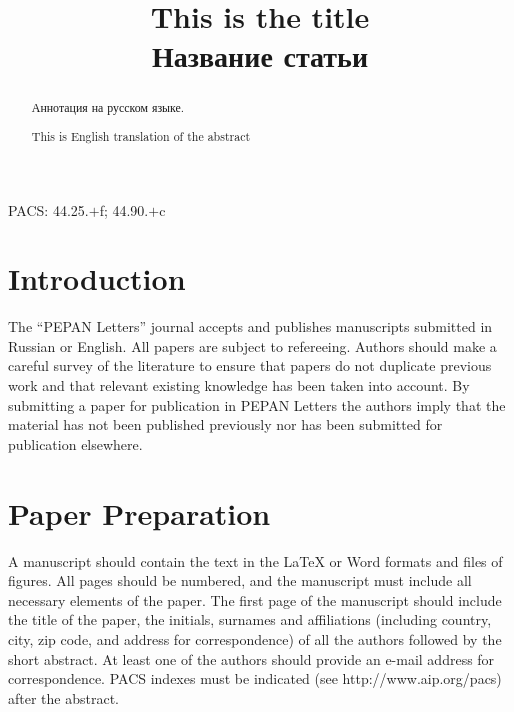 \documentclass[a4paper]{panl}
\begin{document}

\title{This is the title \\ Название статьи}
\maketitle
{}
\setcounter{footnote}{0}

\begin{abstract}
Аннотация на русском языке. \
\vspace{0.2cm}

This is English translation of the abstract
\end{abstract}
\vspace*{6pt}

\noindent
PACS: 44.25.$+$f; 44.90.$+$c

\label{sec:intro}
\section*{Introduction}

The ``PEPAN Letters'' journal accepts and publishes manuscripts submitted in Russian or English. All papers are subject to refereeing. Authors should make a careful survey of the literature to ensure that papers do not duplicate previous work and that relevant existing knowledge has been taken into account. By submitting a paper for publication in PEPAN Letters the authors imply that the material has not been published previously nor has been submitted for publication elsewhere.

\label{sec:preparation}
\section*{Paper Preparation}

A manuscript should contain the text in the LaTeX or Word formats and files of figures. All pages should be numbered, and the manuscript must include all necessary elements of the paper.
The first page of the manuscript should include the title of the paper, the initials, surnames and affiliations (including country, city, zip code, and address for correspondence) of all the authors followed by the short abstract. At least one of the authors should provide an e-mail address for correspondence. PACS indexes must be indicated (see http://www.aip.org/pacs) after the abstract.
\end{document}
